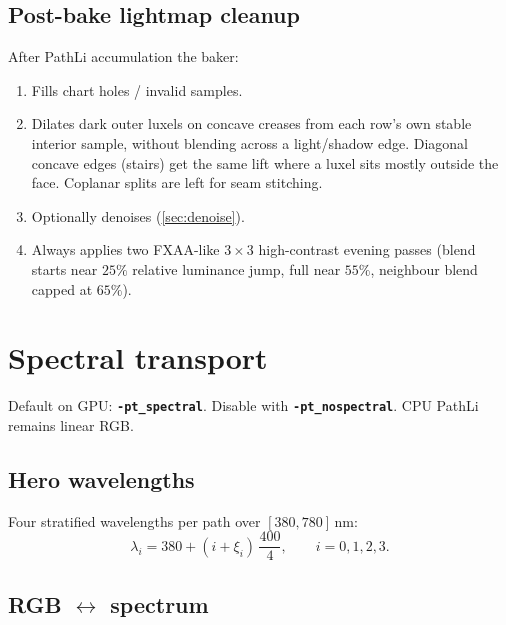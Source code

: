 \documentclass[11pt,a4paper]{article}
\newcommand{\flag}[1]{\texttt{\bfseries #1}}
\begin{document}
\subsection{Post-bake lightmap cleanup}

After PathLi accumulation the baker:
\begin{enumerate}[leftmargin=1.6em]
  \item Fills chart holes / invalid samples.
  \item Dilates dark outer luxels on concave creases from each row's own stable
        interior sample, without blending across a light/shadow edge. Diagonal
        concave edges (stairs) get the same lift where a luxel sits mostly
        outside the face. Coplanar splits are left for seam stitching.
  \item Optionally denoises (\cref{sec:denoise}).
  \item Always applies two FXAA-like $3\times3$ high-contrast evening passes
        (blend starts near $25\%$ relative luminance jump, full near $55\%$,
        neighbour blend capped at $65\%$).
\end{enumerate}

\section{Spectral transport}
\label{sec:spectral}

Default on GPU: \flag{-pt\_spectral}. Disable with \flag{-pt\_nospectral}.
CPU PathLi remains linear RGB.

\subsection{Hero wavelengths}

Four stratified wavelengths per path over $[380,780]\,\mathrm{nm}$:
\begin{equation}
  \lambda_i
  =
  380 + (i+\xi_i)\,\frac{400}{4},
  \qquad i=0,1,2,3.
\end{equation}

\subsection{RGB $\leftrightarrow$ spectrum}
\end{document}
